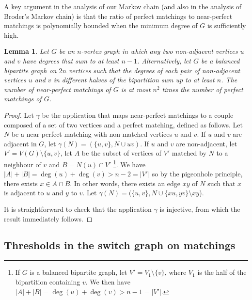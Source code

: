 \documentclass[11pt,a4paper]{article}
\newtheorem{lemma}[theorem]{Lemma}
\theoremstyle{definition}
\begin{document}
 A key argument in the analysis of our
Markov chain (and also in the analysis of Broder's Markov chain) is that the
ratio of perfect matchings to near-perfect matchings is polynomially bounded
when the minimum degree of $G$ is sufficiently high.

\begin{lemma}\label{lem:near-perfect}
  Let $G$ be an $n$-vertex graph in which any two non-adjacent vertices $u$ and
  $v$ have degrees that sum to at least $n-1$. Alternatively, let $G$ be a
  balanced bipartite graph on $2n$ vertices such that the degrees of each pair
  of non-adjacent vertices $u$ and $v$ in different halves of the bipartition
  sum up to at least $n$. The number of near-perfect matchings of $G$ is at most
  $n^2$ times the number of perfect matchings of $G$.
\end{lemma}
\begin{proof}
  Let $\gamma$ be the application that maps near-perfect matchings to a couple
  composed of a set of two vertices and a perfect matching, defined as follows. Let $N$
  be a near-perfect matching with non-matched vertices $u$ and $v$. If $u$ and
  $v$ are adjacent in $G$, let $\gamma(N) = (\{u,v\}, N \cup uv)$. If $u$ and
  $v$ are non-adjacent, let $V' = V(G) \setminus \{u,v\}$, let $A$ be the subset
  of vertices of $V'$ matched by $N$ to a neighbour of $v$ and $B = N(u) \cap
  V'$ \footnote{If $G$ is a balanced bipartite graph, let $V' = V_1 \setminus
    \{v\}$, where $V_1$ is the half of the bipartition containing $v$. We then
    have $|A| + |B| = \deg(u) + \deg(v) > n-1 = |V'|$.}. We have $|A| + |B| =
  \deg(u) + \deg(v) > n-2 = |V'|$ so by the pigeonhole principle, there exists $x
  \in A \cap B$. In other words, there exists an edge $xy$ of
  $N$ such that $x$ is adjacent to $u$ and $y$ to $v$. Let
  $\gamma(N) = (\{u,v\}, N \cup \{xu, yv\} \setminus xy$).

  It is straightforward to check that the application $\gamma$ is injective, from
  which the result immediately follows.
\end{proof}

\subsection{Thresholds in the switch graph on matchings}\label{ssec:thresholds}
\end{document}
